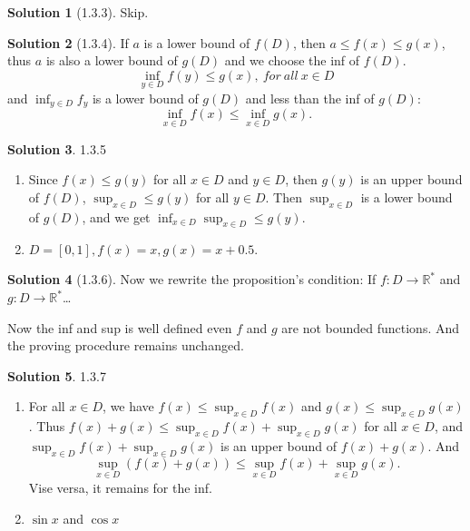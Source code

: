 \documentclass{article}
\theoremstyle{definition}
\newtheorem{sol}{Solution}[exe]
\begin{document}
\begin{sol}[1.3.3]
    Skip.
\end{sol}

\begin{sol}[1.3.4]
    If $a$ is a lower bound of $f(D)$, then $a\leq f(x)\leq g(x)$, thus $a$ is also a lower bound of $g(D)$ and we choose the inf of $f(D)$.
    $$\inf_{y\in D} f(y)\leq g(x),\ for\ all\ x\in D$$
    and $\inf_{y\in D}f_{y}$ is a lower bound of $g(D)$ and less than the inf of $g(D)$:
    $$\inf_{x\in D}f(x)\leq \inf_{x\in D}g(x).$$
\end{sol}

\begin{sol} 1.3.5 
\begin{enumerate}[label=(\alph*)]
\item 
Since $f(x)\leq g(y)$ for all $x\in D$ and $y\in D$, then $g(y)$ is an upper bound of $f(D)$, $\sup_{x\in D}\leq g(y)$ for all $y\in D$. Then $\sup_{x\in D}$ is 
a lower bound of $g(D)$, and we get $\inf_{x\in D}\sup_{x\in D}\leq g(y).$
\item $D=[0,1],f(x)=x,g(x)=x+0.5.$
\end{enumerate}
\end{sol}

\begin{sol}[1.3.6]
    Now we rewrite the proposition's condition: If $f:D\rightarrow \mathbb{R^{*}}$ and $g:D\rightarrow \mathbb{R^{*}}$\dots

    Now the inf and sup is well defined even $f$ and $g$ are not bounded functions. And the proving procedure remains unchanged.
\end{sol}

\begin{sol} 1.3.7
\begin{enumerate}[label=(\alph*)]
\item For all $x\in D$, we have $f(x)\leq \sup_{x\in D} f(x)$ and $g(x)\leq \sup_{x\in D} g(x)$. Thus $f(x)+g(x)\leq \sup_{x\in D} f(x)+\sup_{x\in D} g(x)$ for all $x\in D$, and $\sup_{x\in D} f(x) +\sup_{x\in D} g(x)$ is an upper bound of $f(x)+g(x)$. And $$\sup_{x\in D}(f(x)+g(x))\leq\sup_{x\in D} f(x) +\sup_{x\in D} g(x).$$ 
Vise versa, it remains for the inf.
\item $\sin{x}$ and $\cos{x}$

\end{enumerate}
\end{sol}
\end{document}
